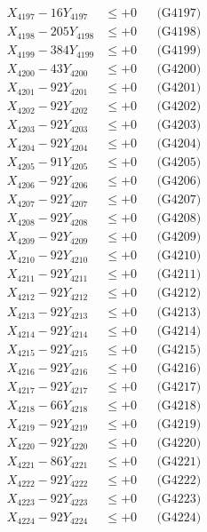 \documentclass[a4paper,10pt]{article}
\begin{document}
{\begin{align}
X_{4197} - 16Y_{4197} &\leq +0 && \text{(G4197)} \\
X_{4198} - 205Y_{4198} &\leq +0 && \text{(G4198)} \\
X_{4199} - 384Y_{4199} &\leq +0 && \text{(G4199)} \\
X_{4200} - 43Y_{4200} &\leq +0 && \text{(G4200)} \\
\allowbreak
X_{4201} - 92Y_{4201} &\leq +0 && \text{(G4201)} \\
X_{4202} - 92Y_{4202} &\leq +0 && \text{(G4202)} \\
X_{4203} - 92Y_{4203} &\leq +0 && \text{(G4203)} \\
X_{4204} - 92Y_{4204} &\leq +0 && \text{(G4204)} \\
X_{4205} - 91Y_{4205} &\leq +0 && \text{(G4205)} \\
X_{4206} - 92Y_{4206} &\leq +0 && \text{(G4206)} \\
X_{4207} - 92Y_{4207} &\leq +0 && \text{(G4207)} \\
X_{4208} - 92Y_{4208} &\leq +0 && \text{(G4208)} \\
X_{4209} - 92Y_{4209} &\leq +0 && \text{(G4209)} \\
X_{4210} - 92Y_{4210} &\leq +0 && \text{(G4210)} \\
\allowbreak
X_{4211} - 92Y_{4211} &\leq +0 && \text{(G4211)} \\
X_{4212} - 92Y_{4212} &\leq +0 && \text{(G4212)} \\
X_{4213} - 92Y_{4213} &\leq +0 && \text{(G4213)} \\
X_{4214} - 92Y_{4214} &\leq +0 && \text{(G4214)} \\
X_{4215} - 92Y_{4215} &\leq +0 && \text{(G4215)} \\
X_{4216} - 92Y_{4216} &\leq +0 && \text{(G4216)} \\
X_{4217} - 92Y_{4217} &\leq +0 && \text{(G4217)} \\
X_{4218} - 66Y_{4218} &\leq +0 && \text{(G4218)} \\
X_{4219} - 92Y_{4219} &\leq +0 && \text{(G4219)} \\
X_{4220} - 92Y_{4220} &\leq +0 && \text{(G4220)} \\
\allowbreak
X_{4221} - 86Y_{4221} &\leq +0 && \text{(G4221)} \\
X_{4222} - 92Y_{4222} &\leq +0 && \text{(G4222)} \\
X_{4223} - 92Y_{4223} &\leq +0 && \text{(G4223)} \\
X_{4224} - 92Y_{4224} &\leq +0 && \text{(G4224)} \\

\end{align}}
\end{document}
